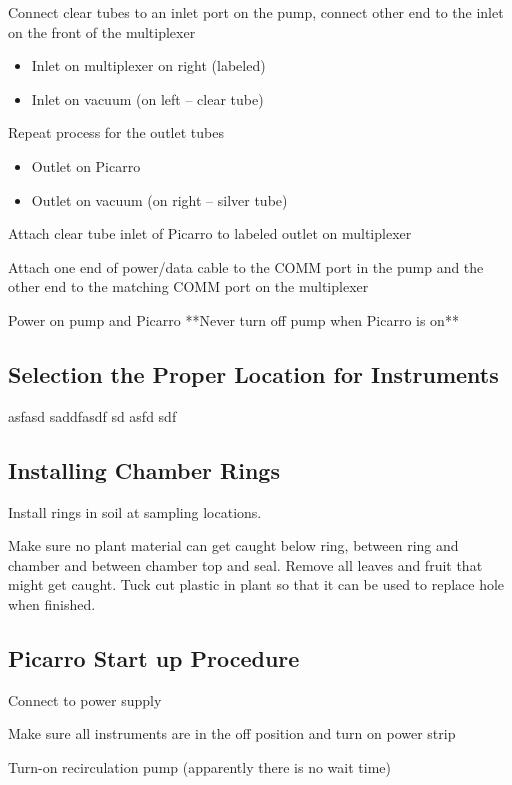 \documentclass[12pt]{../SOP3}\usepackage[]{graphicx}\usepackage[]{color}
\begin{document}
\NP Connect clear tubes to an inlet port on the pump, connect other end to the inlet on the front of the multiplexer
\begin{itemize}
\item Inlet on multiplexer on right (labeled)
\item Inlet on vacuum (on left -- clear tube)
\end{itemize}

\NP Repeat process for the outlet tubes
\begin{itemize}
\item Outlet on Picarro
\item Outlet on vacuum (on right -- silver tube)
\end{itemize}

\NP Attach clear tube inlet of Picarro to labeled outlet on multiplexer

\NP Attach one end of power/data cable to the COMM port in the pump and the other end to the matching COMM port on the multiplexer

\NP Power on pump and Picarro **Never turn off pump when Picarro is on**

\subsection*{Selection the Proper Location for Instruments}

\NP asfasd saddfasdf sd asfd sdf

\subsection*{Installing Chamber Rings}

\NP Install rings in soil at sampling locations. 

\NP Make sure no plant material can get caught below ring, between ring and chamber and between chamber top and seal. Remove all leaves and fruit that might get caught. Tuck cut plastic in plant so that it can be used to replace hole when finished.

\subsection*{Picarro Start up Procedure}

\NP Connect to power supply

\NP Make sure all instruments are in the off position and turn on power strip

\NP Turn-on recirculation pump (apparently there is no wait time)
\end{document}
